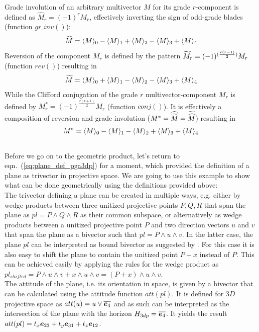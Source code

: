 Grade involution of an arbitrary multivector $M$ for its grade $r$-component is defined as
$\widehat{M}_r = (-1)^r M_r$, effectively inverting the sign of
odd-grade blades (function $gr\_inv()$):
\begin{equation}
\widehat{M} = \langle {M} \rangle_{0} - \langle {M} \rangle_{1} + \langle {M} \rangle_{2} - \langle {M} \rangle_{3} + \langle {M} \rangle_{4}
\end{equation}
Reversion of the component $M_r$ is defined by the pattern $\widetilde{M}_r =
(-1)^{(\frac{r(r-1)}{2})} M_r$ (function $rev()$) resulting in
\begin{equation}
\widetilde{M} = \langle {M} \rangle_{0} + \langle {M} \rangle_{1} - \langle {M} \rangle_{2} - \langle {M} \rangle_{3} + \langle {M} \rangle_{4}
\end{equation}
While the Clifford conjugation of the grade $r$ multivector-component $M_r$ is defined by
$M^*_r = (-1)^{\frac{r(r+1)}{2}} M_r$ (function $conj()$). It is effectively a
composition of reversion and grade involution ($M^* = \widehat{\widetilde{M}} =
\widetilde{\widehat{M}}$) resulting in
 \begin{equation}
M^* = \langle {M} \rangle_{0} - \langle {M} \rangle_{1} - \langle {M} \rangle_{2} + \langle {M} \rangle_{3} + \langle {M} \rangle_{4}
\end{equation} \\

Before we go on to the geometric product, let's return to eqn.~(\ref{eq:plane_def_pga3dp})
for a moment, which provided the definition of a plane as trivector in projective space.
We are going to use this example to show what can be done geometrically using the
definitions provided above: \\

The trivector defining a plane can be created in multiple ways, e.g. either by wedge
products between three unitized projective points $P, Q, R$ that span the plane as $pl = P
\wedge Q \wedge R$ as their common subspace, or alternatively as wedge products between a
unitized projective point $P$ and two direction vectors $u$ and $v$ that span the plane as
a bivector such that $pl = P \wedge u \wedge v$. In the latter case, the plane $pl$ can be
interpreted as bound bivector as suggested by \cite{Browne_Grassmann-Algebra_Vol1:2012}.
For this case it is also easy to shift the plane to contain the unitized point $P+x$
instead of $P$. This can be achieved easily by applying the rules for the wedge product as
$pl_{shifted} = P \wedge u \wedge v + x \wedge u \wedge v = (P+x) \wedge u \wedge v$.\\

The attitude of the plane, i.e. its orientation in space, is given by a bivector that can
be calculated using the attitude function $att(pl)$. It is defined for $3D$ projective
space as $att(u) = u \vee \overline{\bm{e}_{4}}$ and as such can be interpreted as the
intersection of the plane with the horizon $H_{3dp} =\overline{\bm{e}_{4}}$. It yields the result
$att(pl) = t_x \bm{e}_{23} + t_y \bm{e}_{31} + t_z \bm{e}_{12}$.\\

